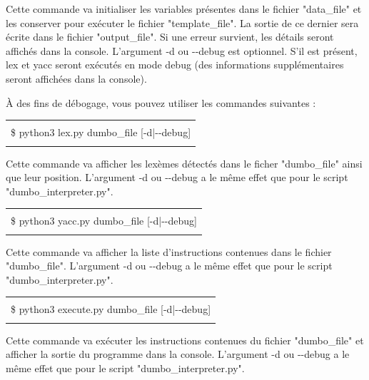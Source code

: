 \documentclass[10pt,a4paper]{article}
\begin{document}
	Cette commande va initialiser les variables présentes dans le fichier "data\_file" et les conserver pour exécuter le fichier "template\_file". La sortie de ce dernier sera écrite dans le fichier "output\_file". Si une erreur survient, les détails seront affichés dans la console. L'argument -d ou -{}-debug est optionnel. S'il est présent, lex et yacc seront exécutés en mode debug (des informations supplémentaires seront affichées dans la console).
	
	À des fins de débogage, vous pouvez utiliser les commandes suivantes :
	
	\begin{center}
	\begin{tabular}{|l|}
		\hline \\
		\$ python3 lex.py dumbo\_file [-d|-{}-debug]\\
		\\
		\hline
	\end{tabular}
	\end{center}
	
	Cette commande va afficher les lexèmes détectés dans le ficher "dumbo\_file" ainsi que leur position. L'argument -d ou -{}-debug a le même effet que pour le script "dumbo\_interpreter.py".
	
	\begin{center}
	\begin{tabular}{|l|}
		\hline \\
		\$ python3 yacc.py dumbo\_file [-d|-{}-debug]\\
		\\
		\hline
	\end{tabular}
	\end{center}
	
	Cette commande va afficher la liste d'instructions contenues dans le fichier "dumbo\_file". L'argument -d ou -{}-debug a le même effet que pour le script "dumbo\_interpreter.py".
	
	\begin{center}
	\begin{tabular}{|l|}
		\hline \\
		\$ python3 execute.py dumbo\_file [-d|-{}-debug]\\
		\\
		\hline
	\end{tabular}
	\end{center}
	
	Cette commande va exécuter les instructions contenues du fichier "dumbo\_file" et afficher la sortie du programme dans la console. L'argument -d ou -{}-debug a le même effet que pour le script "dumbo\_interpreter.py".
	
\end{document}
